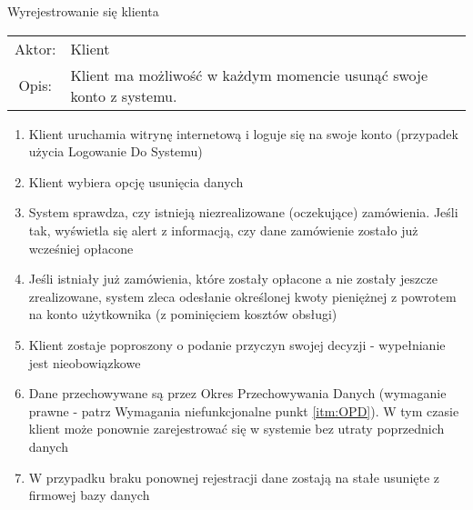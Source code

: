   \item Wyrejestrowanie się klienta \\
  \begin{tabularx}{\linewidth}{ c X }
  Aktor: & Klient \\
  Opis: & Klient ma możliwość w każdym momencie usunąć swoje konto z systemu.\\
  \end{tabularx}
  \begin{enumerate}
    \item Klient uruchamia witrynę internetową i loguje się na swoje konto
    (przypadek użycia Logowanie Do Systemu)
    \item Klient wybiera opcję usunięcia danych
    \item System sprawdza, czy istnieją niezrealizowane (oczekujące) zamówienia.
    Jeśli tak, wyświetla się alert z informacją, czy dane zamówienie zostało już
    wcześniej opłacone
    \item Jeśli istniały już zamówienia, które zostały opłacone a nie zostały
    jeszcze zrealizowane, system zleca odesłanie określonej kwoty pieniężnej z
    powrotem na konto użytkownika (z pominięciem kosztów obsługi)
    \item Klient zostaje poproszony o podanie przyczyn swojej decyzji -
    wypełnianie jest nieobowiązkowe
    \item Dane przechowywane są przez Okres Przechowywania Danych (wymaganie
    prawne - patrz Wymagania niefunkcjonalne punkt \ref{itm:OPD}). W tym
    czasie klient może ponownie zarejestrować się w systemie bez utraty poprzednich danych
    \item W przypadku braku ponownej rejestracji dane zostają na stałe usunięte
    z firmowej bazy danych
  \end{enumerate}